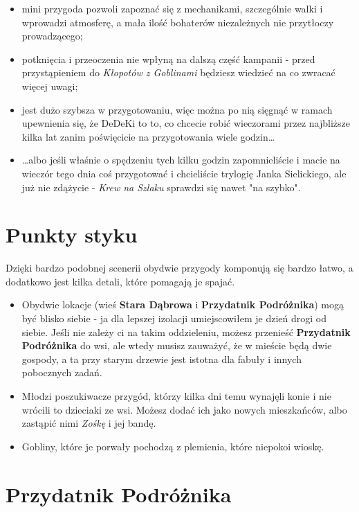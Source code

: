 \begin{twocolumn}
\begin{itemize}
\item mini przygoda pozwoli zapoznać się z mechanikami, szczególnie walki i wprowadzi atmosferę, a mała ilość bohaterów
    niezależnych nie przytłoczy prowadzącego;
\item potknięcia i przeoczenia nie wpłyną na dalszą część kampanii - przed przystąpieniem do \emph{Kłopotów z Goblinami}
    będziesz wiedzieć na co zwracać więcej uwagi;
\item jest dużo szybsza w przygotowaniu, więc można po nią sięgnąć w ramach upewnienia się, że DeDeKi to to, co chcecie
    robić wieczorami przez najbliższe kilka lat zanim poświęcicie na przygotowania wiele godzin…
\item …albo jeśli właśnie o spędzeniu tych kilku godzin zapomnieliście i macie na wieczór tego dnia coś przygotować i
    chcieliście trylogię Janka Sielickiego, ale już nie zdążycie - \emph{Krew na Szlaku} sprawdzi się nawet "na szybko".
\end{itemize}

\section{Punkty styku}

Dzięki bardzo podobnej scenerii obydwie przygody komponują się bardzo łatwo, a dodatkowo jest kilka detali, które
pomagają je spajać.

\begin{itemize}
\item Obydwie lokacje (wieś \textbf{Stara Dąbrowa} i \textbf{Przydatnik Podróżnika}) mogą być blisko siebie - ja dla
    lepszej izolacji umiejscowiłem je dzień drogi od siebie. Jeśli nie zależy ci na takim oddzieleniu, możesz przenieść
    \textbf{Przydatnik Podróżnika} do wsi, ale wtedy musisz zauważyć, że w mieście będą dwie gospody, a ta przy starym
    drzewie jest istotna dla fabuły i innych pobocznych zadań.
\item Młodzi poszukiwacze przygód, którzy kilka dni temu wynajęli konie i nie wrócili to dzieciaki ze wsi. Możesz dodać
    ich jako nowych mieszkańców, albo zastąpić nimi \emph{Zośkę} i jej bandę.
\item Gobliny, które je porwały pochodzą z plemienia, które niepokoi wioskę.
\end{itemize}

\section{Przydatnik Podróżnika}


\end{twocolumn}
